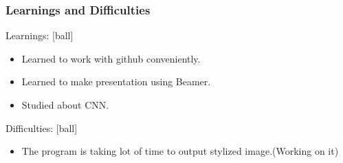 \documentclass[14pt]{beamer}
\begin{document}
\begin{frame}
		\frametitle{Learnings and Difficulties}
		Learnings:
        \begin{itemize}
		\item Learned to work with github conveniently.
		\item Learned to make presentation using Beamer.
		\item Studied about CNN.
		\end{itemize}
		Difficulties:
        \begin{itemize}
				\item The program is taking lot of time to output stylized image.(Working on it)
		\end{itemize}
\end{frame}
\end{document}
